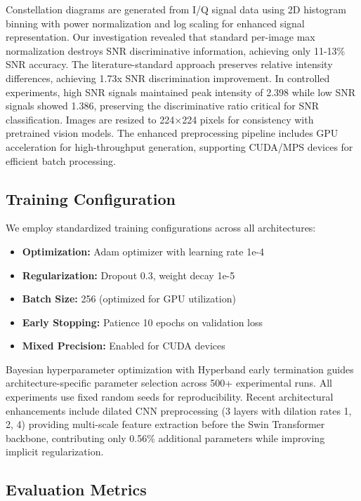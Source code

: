 \documentclass{ELSP}
\begin{document}
{{Constellation diagrams are generated from I/Q signal data using 2D histogram binning with power normalization and log scaling for enhanced signal representation. Our investigation revealed that standard per-image max normalization destroys SNR discriminative information, achieving only 11-13\% SNR accuracy. The literature-standard approach preserves relative intensity differences, achieving 1.73x SNR discrimination improvement. In controlled experiments, high SNR signals maintained peak intensity of 2.398 while low SNR signals showed 1.386, preserving the discriminative ratio critical for SNR classification. Images are resized to 224×224 pixels for consistency with pretrained vision models. The enhanced preprocessing pipeline includes GPU acceleration for high-throughput generation, supporting CUDA/MPS devices for efficient batch processing.

\subsection{Training Configuration}

We employ standardized training configurations across all architectures:
\begin{itemize}
    \item \textbf{Optimization:} Adam optimizer with learning rate 1e-4
    \item \textbf{Regularization:} Dropout 0.3, weight decay 1e-5
    \item \textbf{Batch Size:} 256 (optimized for GPU utilization)
    \item \textbf{Early Stopping:} Patience 10 epochs on validation loss
    \item \textbf{Mixed Precision:} Enabled for CUDA devices
\end{itemize}

Bayesian hyperparameter optimization with Hyperband early termination guides architecture-specific parameter selection across 500+ experimental runs. All experiments use fixed random seeds for reproducibility. Recent architectural enhancements include dilated CNN preprocessing (3 layers with dilation rates 1, 2, 4) providing multi-scale feature extraction before the Swin Transformer backbone, contributing only 0.56\% additional parameters while improving implicit regularization.

\subsection{Evaluation Metrics}

}}
\end{document}
